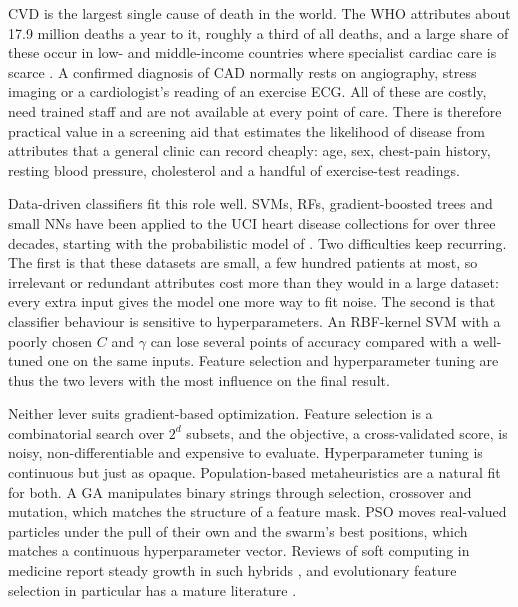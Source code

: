 \documentclass[MTech]{ugthesis}
\begin{document}
\ac{CVD} is the largest single cause of death in the world. The \ac{WHO} attributes about 17.9 million deaths a year to it, roughly a third of all deaths, and a large share of these occur in low- and middle-income countries where specialist cardiac care is scarce \citep{who2021cvd}. A confirmed diagnosis of \ac{CAD} normally rests on angiography, stress imaging or a cardiologist's reading of an exercise \ac{ECG}. All of these are costly, need trained staff and are not available at every point of care. There is therefore practical value in a screening aid that estimates the likelihood of disease from attributes that a general clinic can record cheaply: age, sex, chest-pain history, resting blood pressure, cholesterol and a handful of exercise-test readings.

Data-driven classifiers fit this role well. \ac{SVM}s, \ac{RF}s, gradient-boosted trees and small \ac{NN}s have been applied to the \ac{UCI} heart disease collections for over three decades, starting with the probabilistic model of \citet{detrano1989}. Two difficulties keep recurring. The first is that these datasets are small, a few hundred patients at most, so irrelevant or redundant attributes cost more than they would in a large dataset: every extra input gives the model one more way to fit noise. The second is that classifier behaviour is sensitive to hyperparameters. An RBF-kernel SVM with a poorly chosen $C$ and $\gamma$ can lose several points of accuracy compared with a well-tuned one on the same inputs. Feature selection and hyperparameter tuning are thus the two levers with the most influence on the final result.

Neither lever suits gradient-based optimization. Feature selection is a combinatorial search over $2^d$ subsets, and the objective, a cross-validated score, is noisy, non-differentiable and expensive to evaluate. Hyperparameter tuning is continuous but just as opaque. Population-based metaheuristics are a natural fit for both. A \ac{GA} \citep{holland1975,goldberg1989} manipulates binary strings through selection, crossover and mutation, which matches the structure of a feature mask. \ac{PSO} \citep{kennedy1995pso} moves real-valued particles under the pull of their own and the swarm's best positions, which matches a continuous hyperparameter vector. Reviews of soft computing in medicine report steady growth in such hybrids \citep{yardimci2009medicine,houssein2023softcomputing}, and evolutionary feature selection in particular has a mature literature \citep{xue2016fssurvey}.
\end{document}

